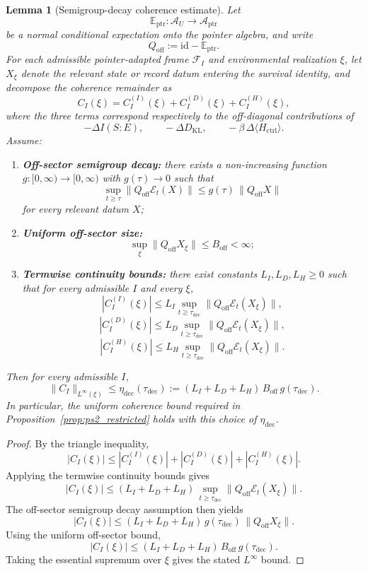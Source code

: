 \documentclass[12pt]{article}
\newtheorem{lemma}[theorem]{Lemma}
\theoremstyle{definition}
\theoremstyle{remark}
\begin{document}
\begin{lemma}[Semigroup-decay coherence estimate]\label{lem:semigroup_coherence}
Let
\[
\mathbb E_{\mathrm{ptr}}:\mathcal A_U\to \mathcal A_{\mathrm{ptr}}
\]
be a normal conditional expectation onto the pointer algebra, and write
\[
Q_{\mathrm{off}}:=\mathrm{id}-\mathbb E_{\mathrm{ptr}}.
\]
For each admissible pointer-adapted frame \(\mathcal F_I\) and
environmental realization \(\xi\), let \(X_\xi\) denote the relevant
state or record datum entering the survival identity, and decompose the
coherence remainder as
\[
C_I(\xi)
=
C_I^{(I)}(\xi)+C_I^{(D)}(\xi)+C_I^{(H)}(\xi),
\]
where the three terms correspond respectively to the off-diagonal
contributions of
\[
-\Delta I(S{:}E),
\qquad
-\Delta D_{\mathrm{KL}},
\qquad
-\beta\,\Delta\langle H_{\mathrm{ctrl}}\rangle.
\]
Assume:
\begin{enumerate}
\item \textbf{Off-sector semigroup decay:} there exists a non-increasing
  function \(g:[0,\infty)\to [0,\infty)\) with \(g(\tau)\to 0\) such
  that
  \[
  \sup_{t\ge \tau}
  \|Q_{\mathrm{off}}\mathcal E_t(X)\|
  \le
  g(\tau)\,\|Q_{\mathrm{off}}X\|
  \]
  for every relevant datum \(X\);
\item \textbf{Uniform off-sector size:}
  \[
  \sup_\xi \|Q_{\mathrm{off}}X_\xi\|
  \le
  B_{\mathrm{off}}
  <
  \infty;
  \]
\item \textbf{Termwise continuity bounds:} there exist constants
  \(L_I,L_D,L_H\ge 0\) such that for every admissible \(I\) and every
  \(\xi\),
  \[
  |C_I^{(I)}(\xi)|
  \le
  L_I\sup_{t\ge\tau_{\mathrm{dec}}}
  \|Q_{\mathrm{off}}\mathcal E_t(X_\xi)\|,
  \]
  \[
  |C_I^{(D)}(\xi)|
  \le
  L_D\sup_{t\ge\tau_{\mathrm{dec}}}
  \|Q_{\mathrm{off}}\mathcal E_t(X_\xi)\|,
  \]
  \[
  |C_I^{(H)}(\xi)|
  \le
  L_H\sup_{t\ge\tau_{\mathrm{dec}}}
  \|Q_{\mathrm{off}}\mathcal E_t(X_\xi)\|.
  \]
\end{enumerate}
Then for every admissible \(I\),
\[
\|C_I\|_{L^\infty(\xi)}
\le
\eta_{\mathrm{dec}}(\tau_{\mathrm{dec}})
:=
(L_I+L_D+L_H)\,B_{\mathrm{off}}\,g(\tau_{\mathrm{dec}}).
\]
In particular, the uniform coherence bound required in
Proposition~\ref{prop:ps2_restricted} holds with this choice of
\(\eta_{\mathrm{dec}}\).
\end{lemma}

\begin{proof}
By the triangle inequality,
\[
|C_I(\xi)|
\le
|C_I^{(I)}(\xi)|+|C_I^{(D)}(\xi)|+|C_I^{(H)}(\xi)|.
\]
Applying the termwise continuity bounds gives
\[
|C_I(\xi)|
\le
(L_I+L_D+L_H)\,
\sup_{t\ge\tau_{\mathrm{dec}}}
\|Q_{\mathrm{off}}\mathcal E_t(X_\xi)\|.
\]
The off-sector semigroup decay assumption then yields
\[
|C_I(\xi)|
\le
(L_I+L_D+L_H)\,
g(\tau_{\mathrm{dec}})\,
\|Q_{\mathrm{off}}X_\xi\|.
\]
Using the uniform off-sector bound,
\[
|C_I(\xi)|
\le
(L_I+L_D+L_H)\,
B_{\mathrm{off}}\,
g(\tau_{\mathrm{dec}}).
\]
Taking the essential supremum over \(\xi\) gives the stated
\(L^\infty\) bound.
\end{proof}
\end{document}
